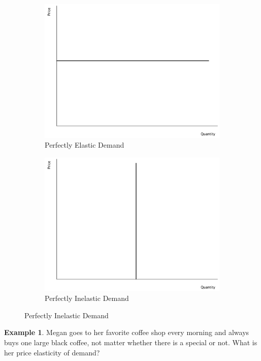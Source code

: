 \documentclass[11pt]{article}\usepackage[]{graphicx}\usepackage[]{color}
\theoremstyle{definition}
\newtheorem{exmp}{Example}[section]
\begin{document}
		
			\begin{figure}[H]
				\centering
				\caption{Extreme Cases}
				\begin{subfigure}{.5\textwidth}
					\includegraphics[scale=.3]{plot24.pdf}
					\caption{Perfectly Elastic Demand}
				\end{subfigure}%
				\begin{subfigure}{.5\textwidth}
					\centering
					\includegraphics[scale=.3]{plot25.pdf}
					\caption{Perfectly Inelastic Demand}
				\end{subfigure}
			\end{figure}

	
	\begin{exmp} 
		Megan goes to her favorite coffee shop every morning and always buys one large black coffee, not matter whether there is a special or not. What is her price elasticity of demand?
	\end{exmp}
	
\end{document}
